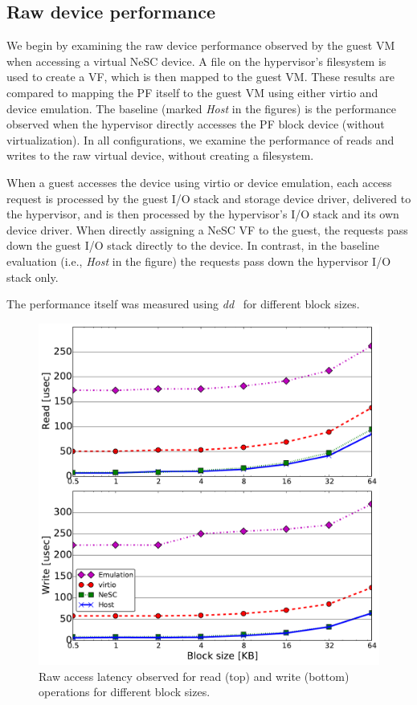 \subsection{Raw device performance}

We begin by examining the raw device performance observed by the guest VM when accessing a virtual NeSC device. A file on the hypervisor's filesystem is used to create a VF, which is then mapped to the guest VM. These results are compared to mapping the PF itself to the guest VM using either virtio and device emulation. The baseline (marked \emph{Host} in the figures) is the performance observed when the hypervisor directly accesses the PF block device (without virtualization).
In all configurations, we examine the performance of reads and writes to the raw virtual device, without creating a filesystem. 

When a guest accesses the device using virtio or device emulation, each access  request is processed by the guest I/O stack and storage device driver, delivered to the hypervisor, and is then processed by the hypervisor's I/O stack and its own device driver.
When directly assigning a NeSC VF to the guest, the requests pass down the guest I/O stack directly to the device. In contrast, in the baseline evaluation (i.e., \emph{Host} in the figure) the requests pass down the hypervisor I/O stack only.

The performance itself was measured using \emph{dd}~\cite{coreutils} for different block sizes.

\begin{figure}[t]
  \centering
  \includegraphics[width=1\columnwidth]{figs/latency_block_size.pdf}
  \caption{Raw access latency observed for read (top) and write (bottom) operations for different block sizes.}
  \label{fig:latency}
\end{figure}

